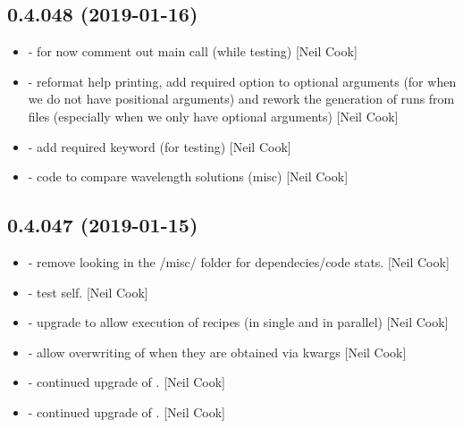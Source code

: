 \documentclass[a4paper,10pt,english]{report}
\begin{document}
\subsection{0.4.048 (2019-01-16)}
\label{\detokenize{misc/changelog:id216}}\begin{itemize}
\item {} 
 - for now comment out main call (while testing)
{[}Neil Cook{]}

\item {} 
 - reformat help printing, add required option to
optional arguments (for when we do not have positional arguments) and
rework the generation of runs from files (especially when we only have
optional arguments) {[}Neil Cook{]}

\item {} 
 - add required keyword (for testing) {[}Neil Cook{]}

\item {} 
 - code to compare wavelength solutions (misc) {[}Neil Cook{]}

\end{itemize}


\subsection{0.4.047 (2019-01-15)}
\label{\detokenize{misc/changelog:id217}}\begin{itemize}
\item {} 
 - remove looking in the /misc/ folder for
dependecies/code stats. {[}Neil Cook{]}

\item {} 
 - test self. {[}Neil Cook{]}

\item {} 
 - upgrade to allow execution of recipes (in single
and in parallel) {[}Neil Cook{]}

\item {} 
 - allow overwriting of  when they are
obtained via kwargs  {[}Neil Cook{]}

\item {} 
 - continued upgrade of . {[}Neil Cook{]}

\item {} 
 - continued upgrade of . {[}Neil Cook{]}

\end{itemize}
\end{document}
